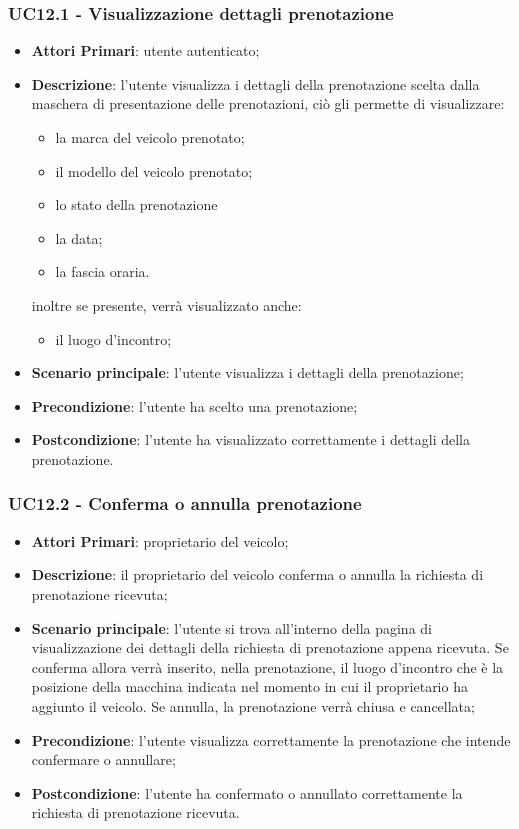  \subsubsection{UC12.1 - Visualizzazione dettagli prenotazione}
\begin{itemize}
	\item \textbf{Attori Primari}: utente autenticato;
	\item \textbf{Descrizione}: l'utente visualizza i dettagli della prenotazione scelta dalla maschera di presentazione delle prenotazioni, ciò gli permette di visualizzare:
	\begin{itemize}
		\item la marca del veicolo prenotato;
		\item il modello del veicolo prenotato;
		\item lo stato della prenotazione
		\item la data;
		\item la fascia oraria.
	\end{itemize}
	inoltre se presente, verrà visualizzato anche:
	\begin{itemize}		
		\item il luogo d'incontro;
	\end{itemize}
	\item \textbf{Scenario principale}: l'utente visualizza i dettagli della prenotazione;	
	\item \textbf{Precondizione}: l'utente ha scelto una prenotazione;
	\item \textbf{Postcondizione}: l'utente ha visualizzato correttamente i dettagli della prenotazione.
\end{itemize}
\subsubsection{UC12.2 - Conferma o annulla prenotazione}
\begin{itemize}
	\item \textbf{Attori Primari}: proprietario del veicolo;
	\item \textbf{Descrizione}: il proprietario del veicolo conferma o annulla la richiesta di prenotazione ricevuta;
	\item \textbf{Scenario principale}: l'utente si trova all'interno della pagina di visualizzazione dei dettagli della richiesta di prenotazione appena ricevuta. Se conferma allora verrà inserito, nella prenotazione, il luogo d'incontro che è la posizione della macchina indicata nel momento in cui il proprietario ha aggiunto il veicolo.\newline
	Se annulla, la prenotazione verrà chiusa e cancellata;
	\item \textbf{Precondizione}: l'utente visualizza correttamente la prenotazione che intende confermare o annullare;
	\item \textbf{Postcondizione}: l'utente ha confermato o annullato correttamente la richiesta di prenotazione ricevuta.
\end{itemize}
